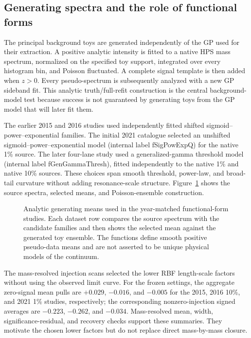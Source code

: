 \subsection{Generating spectra and the role of functional forms}

The principal background toys are generated independently of the GP used for their
extraction.  A positive analytic intensity is fitted to a native HPS mass spectrum,
normalized on the specified toy support, integrated over every histogram bin, and
Poisson fluctuated.  A complete signal template is then added when $z>0$.  Every
pseudo-spectrum is subsequently analyzed with a new GP sideband fit.  This analytic
truth/full-refit construction is the central background-model test because success is
not guaranteed by generating toys from the GP model that will later fit them.

The earlier 2015 and 2016 studies used independently fitted shifted
sigmoid--power--exponential families.  The initial 2021 catalogue selected an
unshifted sigmoid--power--exponential model (internal label fSigPowExpQ) for the native
1\% source.  The later four-lane study used a generalized-gamma threshold model
(internal label fGenGammaThresh), fitted independently to the native 1\% and native
10\% sources.  These choices span smooth threshold, power-law, and broad-tail
curvature without adding resonance-scale structure.  Figure~\ref{fig:v491-functional-form-seed-overview}
shows the source spectra, selected means, and Poisson-ensemble construction.

\begin{figure}[p]
\centering
{}
\caption{Analytic generating means used in the year-matched functional-form studies.
Each dataset row compares the source spectrum with the candidate families and then
shows the selected mean against the generated toy ensemble.  The functions define
smooth positive pseudo-data means and are not asserted to be unique physical models
of the continuum.}
\label{fig:v491-functional-form-seed-overview}
\end{figure}

The mass-resolved injection scans selected the lower RBF length-scale factors without
using the observed limit curve.  For the frozen settings, the aggregate zero-signal
mean pulls are $+0.029$, $-0.016$, and $-0.005$ for the 2015, 2016 10\%, and 2021
1\% studies, respectively; the corresponding nonzero-injection signed averages are
$-0.223$, $-0.262$, and $-0.034$.  Mass-resolved mean, width,
significance-residual, and recovery checks support these summaries.  They motivate the
chosen lower factors but do not replace direct mass-by-mass
closure.

